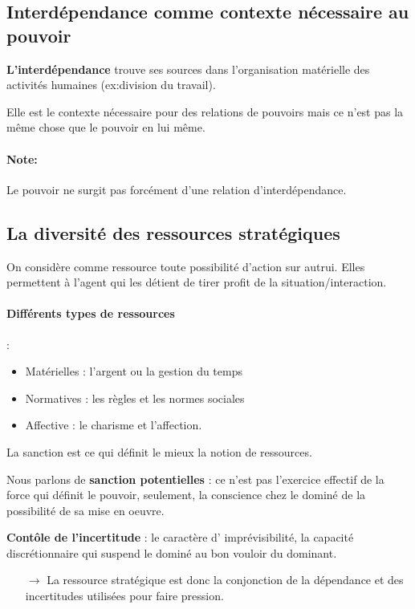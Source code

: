 \documentclass[11pt]{article} %
\begin{document}
\subsection{Interdépendance comme contexte nécessaire au pouvoir}

\textbf{L'interdépendance} trouve ses sources dans l'organisation
matérielle des activités humaines (ex:division du travail).

Elle est le contexte nécessaire pour des relations de pouvoirs mais ce
n'est pas la même chose que le pouvoir en lui même.

\paragraph{Note: } Le pouvoir ne surgit pas forcément d'une relation
d'interdépendance.

\subsection{La diversité des ressources stratégiques}
On considère comme ressource toute possibilité d'action sur autrui.   
Elles permettent à l'agent qui les détient de tirer profit de la      
situation/interaction.                                                 

\paragraph{Différents types de ressources} :

\begin{itemize}
	\item Matérielles : l'argent ou la gestion du temps
	\item Normatives : les règles et les normes sociales
	\item Affective : le charisme et l'affection.
\end{itemize}

La sanction est ce qui définit le mieux la notion de ressources. 

Nous parlons de \textbf{sanction potentielles} : ce n'est pas l'exercice
effectif de la force qui définit le pouvoir, seulement, la conscience
chez le dominé de la possibilité de sa mise en oeuvre.

\textbf{Contôle de l'incertitude} : le caractère d'
imprévisibilité, la capacité discrétionnaire qui suspend le dominé au bon vouloir du dominant.

\begin{itemize}
\item[$\to$] La ressource stratégique est donc la conjonction de la dépendance et des incertitudes utilisées pour faire pression.
    \end{itemize}
\end{document}
